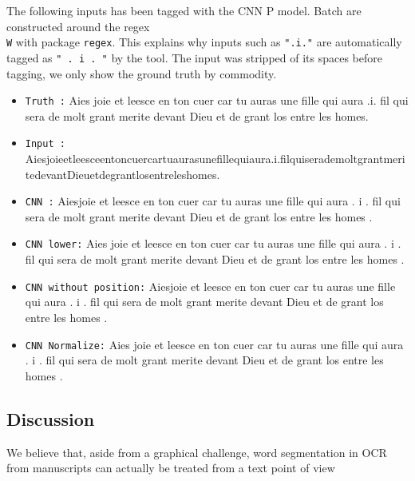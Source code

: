 \documentclass{jdmdh}
\begin{document}
The following inputs has been tagged with the CNN P model. Batch are constructed around the regex \texttt{\\W} with package \texttt{regex}. This explains why inputs such as \texttt{".i."} are automatically tagged as \texttt{" . i . "} by the tool. The input was stripped of its spaces before tagging, we only show the ground truth by commodity.

\begin{itemize}
    \item \texttt{Truth :} Aies joie et leesce en ton cuer car tu auras une fille qui aura .i. fil qui sera de molt grant merite devant Dieu et de grant los entre les homes.
    \item \texttt{Input :} Aiesjoieetleesceentoncuercartuaurasunefillequiaura.i.filquiserademoltgrantmeritedevantDieuetdegrantlosentreleshomes.
    \item \texttt{CNN :} Aiesjoie et leesce en ton cuer car tu auras une fille qui aura . i . fil qui sera de molt grant merite devant Dieu et de grant los entre les homes .
    \item \texttt{CNN lower:}	Aies joie et leesce en ton cuer car tu auras une fille qui aura . i . fil qui sera de molt grant merite devant Dieu et de grant los entre les homes .
    \item \texttt{CNN without position:} Aiesjoie et leesce en ton cuer car tu auras une fille qui aura . i . fil qui sera de molt grant merite devant Dieu et de grant los entre les homes .
    \item \texttt{CNN Normalize:}	Aies joie et leesce en ton cuer car tu auras une fille qui aura . i . fil qui sera de molt grant merite devant Dieu et de grant los entre les homes .
\end{itemize}



\subsection{Discussion}

We believe that, aside from a graphical challenge, word segmentation in OCR from manuscripts can actually be treated from a text point of view

\end{document}
